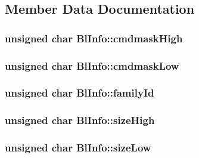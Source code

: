 \subsection{Member Data Documentation}
\hypertarget{struct_bl_info_a6230bfa0bbba06b6d4cbf4a091f29206}{
\subsubsection[{cmdmask\-High}]{\setlength{\rightskip}{0pt plus 5cm}unsigned char Bl\-Info\-::cmdmask\-High}}\label{struct_bl_info_a6230bfa0bbba06b6d4cbf4a091f29206}
\hypertarget{struct_bl_info_a1f12826be55d13f19c756bc5e3428b3c}{
\subsubsection[{cmdmask\-Low}]{\setlength{\rightskip}{0pt plus 5cm}unsigned char Bl\-Info\-::cmdmask\-Low}}\label{struct_bl_info_a1f12826be55d13f19c756bc5e3428b3c}
\hypertarget{struct_bl_info_aa83c1399c74fbc43483497e25d01a944}{
\subsubsection[{family\-Id}]{\setlength{\rightskip}{0pt plus 5cm}unsigned char Bl\-Info\-::family\-Id}}\label{struct_bl_info_aa83c1399c74fbc43483497e25d01a944}
\hypertarget{struct_bl_info_a17fd7e3d13075c98cb3589a5670eaa27}{
\subsubsection[{size\-High}]{\setlength{\rightskip}{0pt plus 5cm}unsigned char Bl\-Info\-::size\-High}}\label{struct_bl_info_a17fd7e3d13075c98cb3589a5670eaa27}
\hypertarget{struct_bl_info_af53fd31e97f796089198cf77681ba9cb}{
\subsubsection[{size\-Low}]{\setlength{\rightskip}{0pt plus 5cm}unsigned char Bl\-Info\-::size\-Low}}\label{struct_bl_info_af53fd31e97f796089198cf77681ba9cb}
